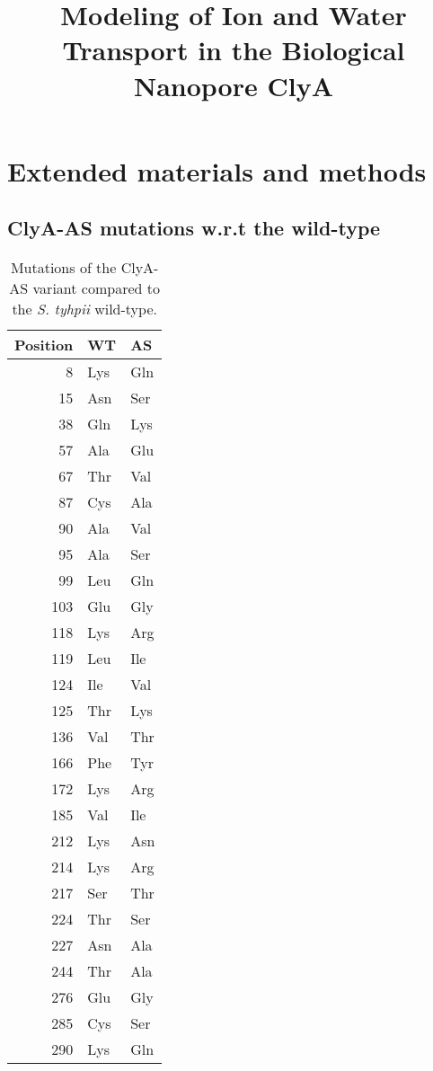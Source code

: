 \documentclass[journal=ancac3, manuscript=suppinfo, etalmode=truncate,maxauthors=0]{achemso}
\title{Modeling of Ion and Water Transport in the Biological Nanopore ClyA}
\begin{document}
\maketitle

\newpage
\section{Extended materials and methods}

\subsection{ClyA-AS mutations w.r.t the wild-type}

\begin{table*}[h]
	\renewcommand{\arraystretch}{1.5}
	\scriptsize
	\caption{Mutations of the ClyA-AS variant compared to the \textit{S. tyhpii} wild-type.}
	\centering
	\label{tab:clya_as_mutations}
	\begin{tabular}{rll}
		\toprule
		Position	& WT	& AS \\
		\midrule
		8			& Lys	& Gln	\\
		15			& Asn	& Ser	\\
		38			& Gln	& Lys	\\
		57			& Ala	& Glu 	\\
		67			& Thr	& Val 	\\
		87			& Cys	& Ala 	\\
		90			& Ala	& Val	\\
		95			& Ala	& Ser 	\\
		99			& Leu	& Gln 	\\
		103	 		& Glu	& Gly	\\
		118			& Lys	& Arg 	\\
		119			& Leu	& Ile	\\
		124			& Ile	& Val	\\
		125			& Thr	& Lys	\\
		136			& Val	& Thr	\\
		166			& Phe	& Tyr	\\
		172			& Lys	& Arg	\\
		185			& Val	& Ile	\\
		212			& Lys	& Asn	\\
		214			& Lys	& Arg	\\
		217			& Ser	& Thr	\\
		224			& Thr	& Ser	\\
		227			& Asn	& Ala	\\
		244			& Thr 	& Ala	\\
		276			& Glu	& Gly	\\
		285			& Cys	& Ser	\\
		290			& Lys	& Gln	\\
		\bottomrule
	\end{tabular}
\end{table*}
\end{document}
